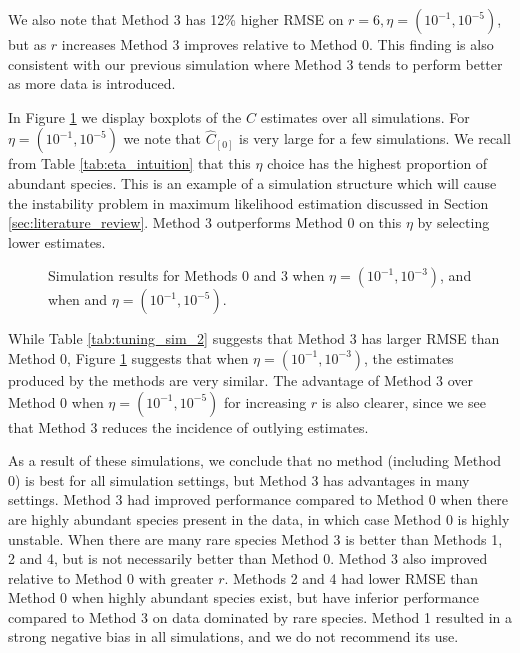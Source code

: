 \documentclass[12pt]{article}
\begin{document}
We also note that Method 3 has 12\% higher RMSE on $r=6, \eta = (10^{-1}, 10^{-5})$, but as $r$ increases Method 3 improves relative to Method 0.  This finding is also consistent with our previous simulation where Method 3 tends to perform better as more data is introduced.

In Figure \ref{fig:tuning_sim_2} we display boxplots of the $C$ estimates over all simulations.  For $\eta = (10^{-1}, 10^{-5})$ we note that $\widehat{C}_{[0]}$ is very large for a few simulations.  We recall from Table \ref{tab:eta_intuition} that this $\eta$ choice has the highest proportion of abundant species.  This is an example of a simulation structure which will cause the instability problem in maximum likelihood estimation discussed in Section \ref{sec:literature_review}.
Method 3 outperforms Method 0 on this $\eta$ by selecting lower estimates.

\begin{figure}[t]
\caption{Simulation results for Methods 0 and 3 when $\eta = (10^{-1}, 10^{-3})$, and when and $\eta = (10^{-1}, 10^{-5})$.
\label{fig:tuning_sim_2}}
\centering{}
\end{figure}

While Table \ref{tab:tuning_sim_2} suggests that Method 3 has larger RMSE than Method 0, Figure \ref{fig:tuning_sim_2} suggests that when  $\eta = (10^{-1}, 10^{-3})$, the estimates produced by the methods are very similar. The advantage of Method 3 over Method 0 when $\eta = (10^{-1}, 10^{-5})$ for increasing $r$ is also clearer, since we see that Method 3 reduces the incidence of outlying estimates.

As a result of these simulations, we conclude that no method (including Method 0) is best for all simulation settings, but Method 3 has advantages in many settings. Method 3 had improved performance compared to Method 0 when there are highly abundant species present in the data, in which case Method 0 is highly unstable.  When there are many rare species Method 3 is better than Methods 1, 2 and 4, but is not necessarily better than Method 0.  Method 3 also improved relative to Method 0 with greater $r$.  Methods 2 and 4 had lower RMSE than Method 0 when highly abundant species exist, but have inferior performance compared to Method 3 on data dominated by rare species. Method 1 resulted in a strong negative bias in all simulations, and we do not recommend its use.
\end{document}
